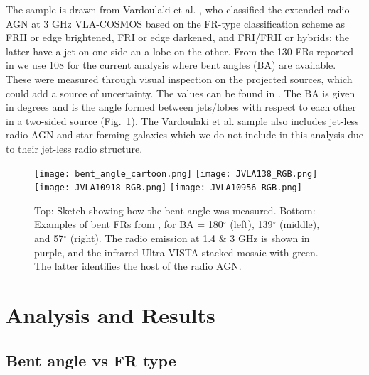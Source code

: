 \documentclass[galaxies,article,submit,moreauthors,pdftex]{Definitions/mdpi}
\begin{document}
The sample is drawn from Vardoulaki et al. \citep{vardoulaki21}, who classified the extended radio AGN at 3 GHz VLA-COSMOS based on the FR-type classification scheme \citep{fr74} as FRII or edge brightened, FRI or edge darkened, and FRI/FRII or hybrids; the latter have a jet on one side an a lobe on the other. From the 130 FRs reported in \cite{vardoulaki21} we use 108 for the current analysis where bent angles (BA) are available. These were measured through visual inspection on the projected sources, which could add a source of uncertainty. The values can be found in \cite{vardoulaki21}. The BA is given in degrees and is the angle formed between jets/lobes with respect to each other in a two-sided source (Fig.~\ref{fig:bent_sketch}). The Vardoulaki et al. \cite{vardoulaki21} sample also includes jet-less radio AGN and star-forming galaxies which we do not include in this analysis due to their jet-less radio structure. 

    \begin{figure}[!ht]
  \resizebox{\hsize}{!}
 {\texttt{[image: bent\_angle\_cartoon.png]}}
 \resizebox{\hsize}{!}
{\texttt{[image: JVLA138\_RGB.png]}%
 \texttt{[image: JVLA10918\_RGB.png]}
\texttt{[image: JVLA10956\_RGB.png]}
            }
                 
       \caption{Top: Sketch showing how the bent angle was measured. Bottom: Examples of bent FRs from \cite{vardoulaki21}, for BA = 180$^{\circ}$ (left), 139$^{\circ}$ (middle), and 57$^{\circ}$ (right). The radio emission at 1.4 \& 3 GHz is shown in purple, and the infrared Ultra-VISTA stacked mosaic with green. The latter identifies the host of the radio AGN.
   }
              \label{fig:bent_sketch}%
    \end{figure}
\section{Analysis and Results}





 \subsection{Bent angle vs FR type}
\end{document}
